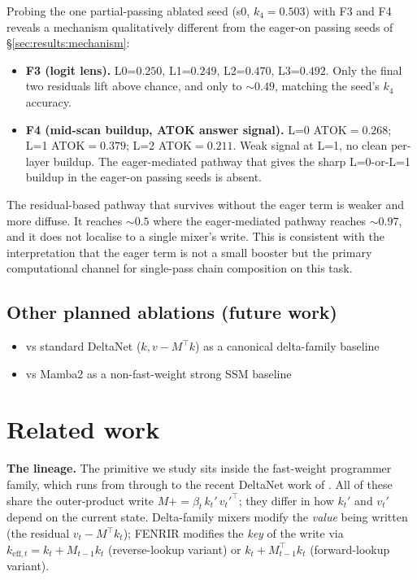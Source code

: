 \documentclass[11pt]{article}
\begin{document}
Probing the one partial-passing ablated seed (s0, $k_4{=}0.503$) with
F3 and F4 reveals a mechanism qualitatively different from the
eager-on passing seeds of \S\ref{sec:results:mechanism}:

\begin{itemize}
\item \textbf{F3 (logit lens).} L0=$0.250$, L1=$0.249$, L2=$0.470$,
      L3=$0.492$. Only the final two residuals lift above chance, and
      only to $\sim$$0.49$, matching the seed's $k_4$ accuracy.
\item \textbf{F4 (mid-scan buildup, ATOK answer signal).} L=0
      ATOK$={}0.268$; L=1 ATOK$={}0.379$; L=2 ATOK$={}0.211$. Weak
      signal at L=1, no clean per-layer buildup. The eager-mediated
      pathway that gives the sharp L=0-or-L=1 buildup in the
      eager-on passing seeds is absent.
\end{itemize}

The residual-based pathway that survives without the eager term is
weaker and more diffuse. It reaches $\sim$$0.5$ where the
eager-mediated pathway reaches $\sim$$0.97$, and it does not localise
to a single mixer's write. This is consistent with the interpretation
that the eager term is not a small booster but the primary
computational channel for single-pass chain composition on this task.

\subsection{Other planned ablations (future work)}

\begin{itemize}
\item vs standard DeltaNet ($k, v - M^\top k$) as a canonical
      delta-family baseline
\item vs Mamba2 as a non-fast-weight strong SSM baseline
\end{itemize}

\section{Related work}
\label{sec:related}

\textbf{The lineage.} The primitive we study sits inside the
fast-weight programmer family, which runs from
\citet{schmidhuber1992fastweights} through
\citet{schlag2021linear,schlag2021deltanet} to the recent DeltaNet
work of \citet{yang2024parallelizing,yang2024gated}. All of these
share the outer-product write $M \mathrel{{+}{=}} \beta_t \, k_t' \,
v_t'^{\top}$; they differ in how $k_t'$ and $v_t'$ depend on the
current state. Delta-family mixers modify the \emph{value} being
written (the residual $v_t - M^{\top} k_t$); FENRIR modifies the
\emph{key} of the write via $k_{\text{eff},t} = k_t + M_{t-1} k_t$
(reverse-lookup variant) or $k_t + M_{t-1}^{\top} k_t$
(forward-lookup variant).
\end{document}
